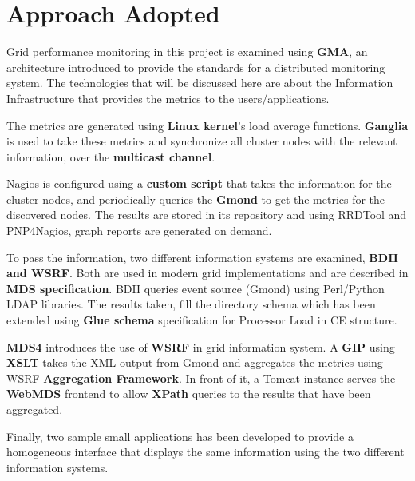
\section{Approach Adopted}

Grid performance monitoring in this project is examined using {\bf \ac{GMA}}, an architecture introduced to provide the standards for a distributed monitoring system. The technologies that will be discussed here are about the Information Infrastructure that provides the metrics to the users/applications.

The metrics are generated using {\bf Linux kernel}'s load average functions. {\bf Ganglia} is used to take these metrics and synchronize all cluster nodes with the relevant information, over the {\bf multicast channel}.

Nagios is configured using a {\bf custom script} that takes the information for the cluster nodes, and periodically queries the {\bf Gmond} to get the metrics for the discovered nodes. The results are stored in its repository and using RRDTool and PNP4Nagios, graph reports are generated on demand.

To pass the information, two different information systems are examined, {\bf \ac{BDII} and \ac{WSRF}}. Both are used in modern grid implementations and are described in {\bf \ac{MDS} specification}. \ac{BDII} queries event source (Gmond) using Perl/Python LDAP libraries. The results taken, fill the directory schema which has been extended using {\bf Glue schema} specification for Processor Load in \ac{CE} structure.

{\bf \ac{MDS}4} introduces the use of {\bf \ac{WSRF}} in grid information system. A {\bf \ac{GIP}} using {\bf \ac{XSLT}} takes the XML output from Gmond and aggregates the metrics using \ac{WSRF} {\bf Aggregation Framework}. In front of it, a Tomcat instance serves the {\bf WebMDS} frontend to allow {\bf XPath} queries to the results that have been aggregated.

Finally, two sample small applications has been developed to provide a homogeneous interface that displays the same information using the two different information systems.

